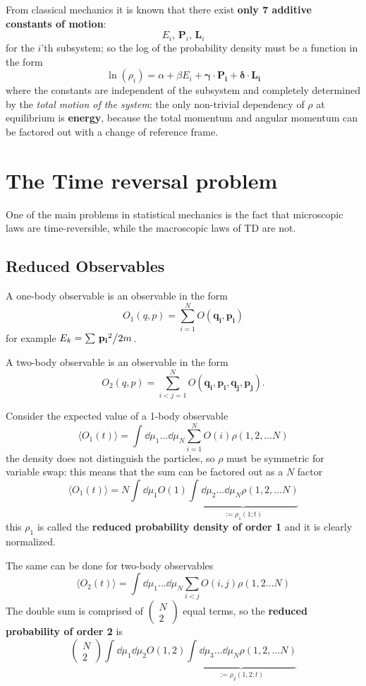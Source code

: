 From classical mechanics it is known that there exist \textbf{only 7 additive
constants of motion}:
$$E_i,\,\mathbf{P}_i,\,\mathbf{L}_i$$
for the $i$'th subsystem; so the log of the probability density must be a
function in the form
$$\ln(\rho_i) = \alpha+\beta E_i + \mathbf{\gamma}\cdot\mathbf{P_i}+
\mathbf{\delta}\cdot\mathbf{L_i}$$
where the constants are independent of the subsystem and completely determined by
the \textit{total motion of the system}: the only non-trivial dependency of
$\rho$ at equilibrium is \textbf{energy}, because the total momentum and angular
momentum can be factored out with a change of reference frame.
\section{The Time reversal problem}
One of the main problems in statistical mechanics is the fact that microscopic
laws are time-reversible, while the macroscopic laws of TD are not.
\subsection{Reduced Observables}
A one-body observable is an observable in the form
$$O_1(q,p) = \sum_{i=1}^{N} O(\mathbf{q_i,p_i})$$
for example $E_k = \sum_{}^{}\flatfrac{\mathbf{p_i}^2}{2m}$.

A two-body observable is an observable in the form
$$O_2(q,p) = \sum_{i<j=1}^{N}O(\mathbf{q_i},\mathbf{p_i},\mathbf{q_j},
\mathbf{p_j}).$$

Consider the expected value of a 1-body observable
$$\langle O_1(t)\rangle = \int_{}^{}\dd\mu_1...\dd\mu_N \sum_{i=1}^{N} O(i)
\rho(1,2,...N)$$
the density does not distinguish the particles, so $\rho$ must be symmetric
for variable swap: this means that the sum can be factored out as a $N$ factor
$$\langle O_1(t)\rangle = N\int_{}^{}\dd\mu_1 O(1)
\underbrace{\int_{}^{}\dd\mu_2...\dd\mu_N \rho(1,2,...N)}_{:=\rho_1(1;t)}$$
this $\rho_1$ is called the \textbf{reduced probability density of order 1} and
it is clearly normalized.

The same can be done for two-body observables
$$\langle O_2(t)\rangle=\int_{}^{}\dd\mu_1...\dd\mu_N \sum_{i<j}^{}O(i,j)\rho
(1,2...N)$$
The double sum is comprised of $\begin{pmatrix}
N\\2
\end{pmatrix}
$ equal terms, so the \textbf{reduced probability of order 2} is 
$$\begin{pmatrix}
N\\2
\end{pmatrix}
\int_{}^{}\dd\mu_1\dd\mu_2 O(1,2)\underbrace{\int_{}^{}\dd\mu_3...\dd\mu_N
\rho(1,2,...N)}_{:=\rho_2(1,2;t)}
$$

